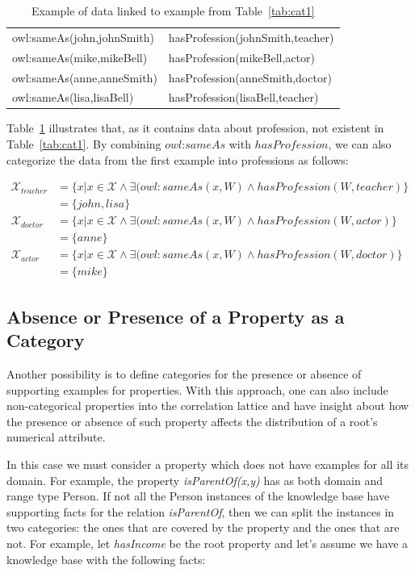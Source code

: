 \begin{table}[h!]
 \label{tab:cat2}
 \begin{center}
 \caption{Example of data linked to example from Table~\ref{tab:cat1}}
  \begin{tabular}{l l}
    \toprule
    owl:sameAs(john,johnSmith)& hasProfession(johnSmith,teacher)  \\
    owl:sameAs(mike,mikeBell) & hasProfession(mikeBell,actor) 	 \\
    owl:sameAs(anne,anneSmith)& hasProfession(anneSmith,doctor)	 \\
    owl:sameAs(lisa,lisaBell) & hasProfession(lisaBell,teacher)  \\
    \bottomrule
  \end{tabular}
 \end{center}
\end{table}

Table~\ref{tab:cat2} illustrates that, as it contains data about profession, not existent in Table~\ref{tab:cat1}.
By combining $owl$:$sameAs$ with $hasProfession$, we can also categorize the data from the first example into
professions as follows:

\begin{align*}
\mathcal{X}_{teacher}&=\{ x|x \in \mathcal{X} \wedge \exists (owl:sameAs(x,W) \wedge hasProfession(W,teacher)\} \\
  &=\{john,lisa\} \\
\mathcal{X}_{doctor}&=\{ x|x \in \mathcal{X} \wedge \exists (owl:sameAs(x,W) \wedge hasProfession(W,actor)\} \\
  &=\{anne\} \\
\mathcal{X}_{actor}&=\{ x|x \in \mathcal{X} \wedge \exists (owl:sameAs(x,W) \wedge hasProfession(W,doctor)\} \\
  &=\{mike\}
\end{align*}


\subsection{Absence or Presence of a Property as a Category}

Another possibility is to define categories for the presence or absence of supporting examples for properties. With
this approach, one can also include non-categorical properties into the correlation lattice and have insight about how
the presence or absence of such property affects the distribution of a root's numerical attribute.

In this case we must consider a property which does not have examples for all its domain. For example, the property
\emph{isParentOf(x,y)} has as both domain and range type Person. If not all the Person instances of the knowledge base
have supporting facts for the relation \emph{isParentOf}, then we can split the instances in two categories: the ones
that are covered by the property and the ones that are not. For example, let \emph{hasIncome} be the root property and
let's assume we have a knowledge base with the following facts:

